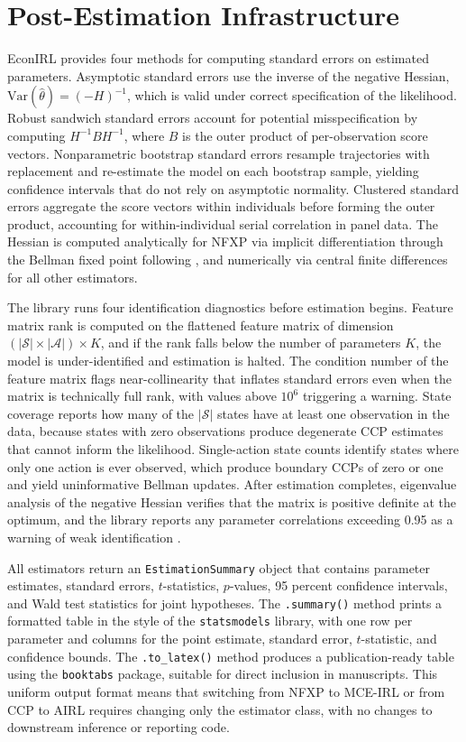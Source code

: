 \section{Post-Estimation Infrastructure}
\label{sec:post_estimation}

EconIRL provides four methods for computing standard errors on estimated parameters. Asymptotic standard errors use the inverse of the negative Hessian, $\mathrm{Var}(\hat\theta) = (-H)^{-1}$, which is valid under correct specification of the likelihood. Robust sandwich standard errors account for potential misspecification by computing $H^{-1} B H^{-1}$, where $B$ is the outer product of per-observation score vectors. Nonparametric bootstrap standard errors resample trajectories with replacement and re-estimate the model on each bootstrap sample, yielding confidence intervals that do not rely on asymptotic normality. Clustered standard errors aggregate the score vectors within individuals before forming the outer product, accounting for within-individual serial correlation in panel data. The Hessian is computed analytically for NFXP via implicit differentiation through the Bellman fixed point following \citet{iskhakov2016}, and numerically via central finite differences for all other estimators.

The library runs four identification diagnostics before estimation begins. Feature matrix rank is computed on the flattened feature matrix of dimension $(|\mathcal{S}| \times |\mathcal{A}|) \times K$, and if the rank falls below the number of parameters $K$, the model is under-identified and estimation is halted. The condition number of the feature matrix flags near-collinearity that inflates standard errors even when the matrix is technically full rank, with values above $10^6$ triggering a warning. State coverage reports how many of the $|\mathcal{S}|$ states have at least one observation in the data, because states with zero observations produce degenerate CCP estimates that cannot inform the likelihood. Single-action state counts identify states where only one action is ever observed, which produce boundary CCPs of zero or one and yield uninformative Bellman updates. After estimation completes, eigenvalue analysis of the negative Hessian verifies that the matrix is positive definite at the optimum, and the library reports any parameter correlations exceeding 0.95 as a warning of weak identification \citep{magnacThesmar2002}.

All estimators return an \texttt{EstimationSummary} object that contains parameter estimates, standard errors, $t$-statistics, $p$-values, 95 percent confidence intervals, and Wald test statistics for joint hypotheses. The \texttt{.summary()} method prints a formatted table in the style of the \texttt{statsmodels} library, with one row per parameter and columns for the point estimate, standard error, $t$-statistic, and confidence bounds. The \texttt{.to\_latex()} method produces a publication-ready table using the \texttt{booktabs} package, suitable for direct inclusion in manuscripts. This uniform output format means that switching from NFXP to MCE-IRL or from CCP to AIRL requires changing only the estimator class, with no changes to downstream inference or reporting code.

